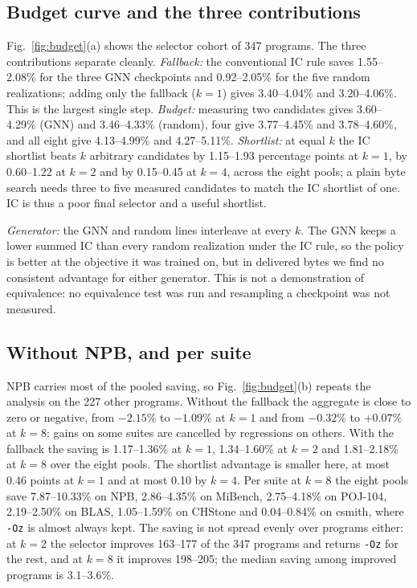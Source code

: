 \documentclass[conference,a4paper]{IEEEtran}
\begin{document}
\subsection{Budget curve and the three contributions}
Fig.~\ref{fig:budget}(a) shows the selector cohort of 347 programs. The
three contributions separate cleanly. \emph{Fallback:} the conventional
IC rule saves 1.55--2.08\% for the three GNN checkpoints and
0.92--2.05\% for the five random realizations; adding only the fallback
($k{=}1$) gives 3.40--4.04\% and 3.20--4.06\%. This is the largest single
step. \emph{Budget:} measuring two candidates gives 3.60--4.29\% (GNN)
and 3.46--4.33\% (random), four give 3.77--4.45\% and 3.78--4.60\%, and
all eight give 4.13--4.99\% and 4.27--5.11\%. \emph{Shortlist:} at equal
$k$ the IC shortlist beats $k$ arbitrary candidates by 1.15--1.93
percentage points at $k{=}1$, by 0.60--1.22 at $k{=}2$ and by 0.15--0.45 at
$k{=}4$, across the eight pools; a plain byte search needs three to five
measured candidates to match the IC shortlist of one. IC is thus a poor
final selector and a useful shortlist.

\emph{Generator:} the GNN and random lines interleave at every $k$. The
GNN keeps a lower summed IC than every random realization under the IC
rule, so the policy is better at the objective it was trained on, but
in delivered bytes we find no consistent advantage for either
generator. This is not a demonstration of equivalence: no equivalence
test was run and resampling a checkpoint was not measured.

\subsection{Without NPB, and per suite}
NPB carries most of the pooled saving, so Fig.~\ref{fig:budget}(b)
repeats the analysis on the 227 other programs. Without the fallback
the aggregate is close to zero or negative, from $-2.15\%$ to $-1.09\%$ at
$k{=}1$ and from $-0.32\%$ to $+0.07\%$ at $k{=}8$: gains on some suites are
cancelled by regressions on others. With the fallback the saving is
1.17--1.36\% at $k{=}1$, 1.34--1.60\% at $k{=}2$ and 1.81--2.18\% at
$k{=}8$ over the eight pools. The shortlist advantage is smaller here, at
most 0.46 points at $k{=}1$ and at most 0.10 by $k{=}4$. Per suite at $k{=}8$
the eight pools save 7.87--10.33\% on NPB, 2.86--4.35\% on MiBench,
2.75--4.18\% on POJ-104, 2.19--2.50\% on BLAS, 1.05--1.59\% on CHStone and
0.04--0.84\% on csmith, where \texttt{-Oz} is almost always kept. The
saving is not spread evenly over programs either: at $k{=}2$ the selector
improves 163--177 of the 347 programs and returns \texttt{-Oz} for the
rest, and at $k{=}8$ it improves 198--205; the median saving among improved
programs is 3.1--3.6\%.
\end{document}
